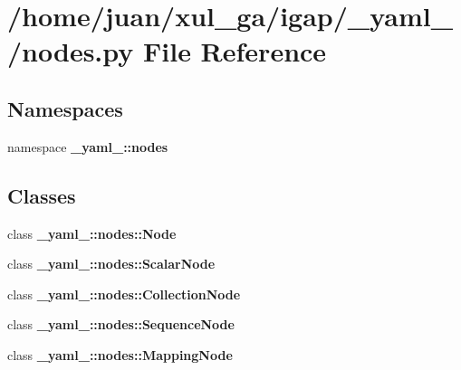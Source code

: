 \section{/home/juan/xul\_\-ga/igap/\_\-yaml\_\-/nodes.py File Reference}
\label{nodes_8py}
\subsection*{Namespaces}
\begin{CompactItemize}
\item 
namespace {\bf \_\-yaml\_\-::nodes}
\end{CompactItemize}
\subsection*{Classes}
\begin{CompactItemize}
\item 
class {\bf \_\-yaml\_\-::nodes::Node}
\item 
class {\bf \_\-yaml\_\-::nodes::ScalarNode}
\item 
class {\bf \_\-yaml\_\-::nodes::CollectionNode}
\item 
class {\bf \_\-yaml\_\-::nodes::SequenceNode}
\item 
class {\bf \_\-yaml\_\-::nodes::MappingNode}
\end{CompactItemize}
